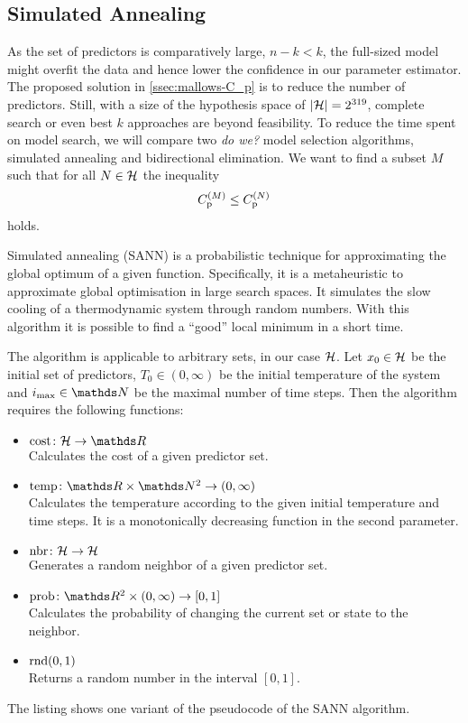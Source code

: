 
	\subsection{Simulated Annealing}
	\label{ssec:model-selec}
	
		As the set of predictors is comparatively large, $n-k < k$, the full-sized model might overfit the data and hence lower the confidence in our parameter estimator.
		The proposed solution in \ref{ssec:mallows-C_p} is to reduce the number of predictors.
		Still, with a size of the hypothesis space of $\left\vert \mathcal{H} \right\vert = 2^{319}$, complete search or even best $k$ approaches are beyond feasibility.
		To reduce the time spent on model search, we will compare two \textsl{do we?} model selection algorithms, simulated annealing and bidirectional elimination.	
		We want to find a subset $M$ such that for all $N\in\mathcal{H}$ the inequality
		\[
			C_{\mathrm{p}}^{(M)} \leq C_{\mathrm{p}}^{(N)}
		\]
		holds.

		Simulated annealing (SANN) is a probabilistic technique for approximating the global optimum of a given function.
		Specifically, it is a metaheuristic to approximate global optimisation in large search spaces.
		It simulates the slow cooling of a thermodynamic system through random numbers.
		With this algorithm it is possible to find a \enquote{good} local minimum in a short time.

		The algorithm is applicable to arbitrary sets, in our case $\mathcal{H}$.
		Let $x_0\in\mathcal{H}$ be the initial set of predictors, $T_0\in(0,\infty)$ be the initial temperature of the system and $i_\m{max}\in\SN$ be the maximal number of time steps.
		Then the algorithm requires the following functions:
		\begin{itemize}
			\item $\func{\m{cost}}{\s{H}}{\SR}$ \\
				Calculates the cost of a given predictor set.
			\item $\func{\m{temp}}{\SR\times\SN^2}{(0,\infty)}$\\
				Calculates the temperature according to the given initial temperature and time steps.
				It is a monotonically decreasing function in the second parameter.
			\item $\mathrm{nbr}\colon\mathcal{H}\to\mathcal{H}$ \\
				Generates a random neighbor of a given predictor set.
			\item $\func{\m{prob}}{\SR^2\times(0,\infty)}{[0,1]}$ \\
				Calculates the probability of changing the current set or state to the neighbor.
			\item $\mathrm{rnd}(0,1)$ \\
				Returns a random number in the interval $[0,1]$.
		\end{itemize}
		The listing shows one variant of the pseudocode of the SANN algorithm. 

